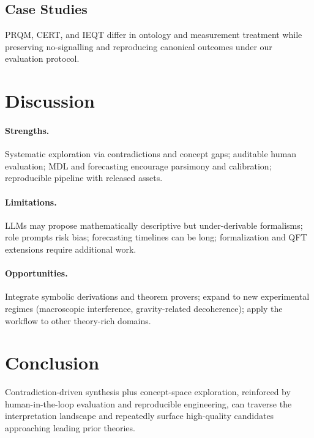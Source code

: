 \documentclass[11pt]{article}
\begin{document}
\subsection{Case Studies}
PRQM, CERT, and IEQT differ in ontology and measurement treatment while preserving no-signalling and reproducing canonical outcomes under our evaluation protocol.

\section{Discussion}
\paragraph{Strengths.} Systematic exploration via contradictions and concept gaps; auditable human evaluation; MDL and forecasting encourage parsimony and calibration; reproducible pipeline with released assets.
\paragraph{Limitations.} LLMs may propose mathematically descriptive but under-derivable formalisms; role prompts risk bias; forecasting timelines can be long; formalization and QFT extensions require additional work.
\paragraph{Opportunities.} Integrate symbolic derivations and theorem provers; expand to new experimental regimes (macroscopic interference, gravity-related decoherence); apply the workflow to other theory-rich domains.

\section{Conclusion}
Contradiction-driven synthesis plus concept-space exploration, reinforced by human-in-the-loop evaluation and reproducible engineering, can traverse the interpretation landscape and repeatedly surface high-quality candidates approaching leading prior theories.



\end{document}
